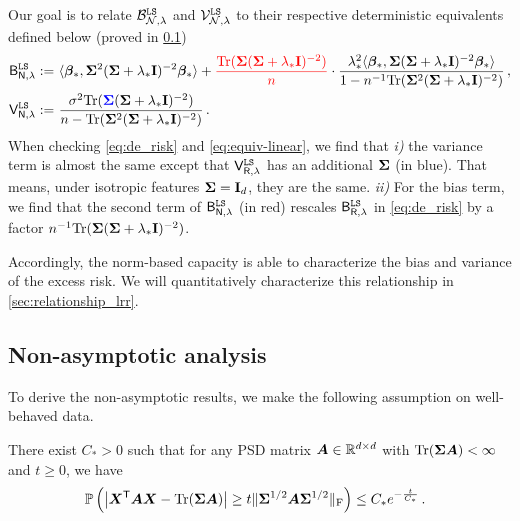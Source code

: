 Our goal is to relate $\mathcal{B}^{\tt LS}_{\mathcal{N},\lambda}$ and $\mathcal{V}^{\tt LS}_{\mathcal{N},\lambda}$ to their respective deterministic equivalents defined below (proved in \cref{sec:linear_nonasym})
\begin{align}
    \mathsf B_{\mathsf N,\lambda}^{\tt LS} :=&~ \langle{\boldsymbol \beta}_*, {\boldsymbol \Sigma}^2({\boldsymbol \Sigma} + \lambda_*{\mathbf I})^{-2}{\boldsymbol \beta}_*\rangle +{\color{red}\frac{{\rm Tr}({\boldsymbol \Sigma}({\boldsymbol \Sigma} + \lambda_*{\mathbf I})^{-2})}{n}} \cdot \frac{\lambda_*^2 \langle {\boldsymbol \beta}_*,{\boldsymbol \Sigma}({\boldsymbol \Sigma} + \lambda_*{\mathbf I})^{-2}{\boldsymbol \beta}_*\rangle}{1-n^{-1}{\rm Tr}({\boldsymbol \Sigma}^2({\boldsymbol \Sigma} + \lambda_*{\mathbf I})^{-2})} \,, \notag \\
    \mathsf V_{\mathsf N,\lambda}^{\tt LS} :=&~ \frac{\sigma^2{\rm Tr}({\color{blue}{\boldsymbol \Sigma}}({\boldsymbol \Sigma}+\lambda_*{\mathbf I})^{-2})}{n-{\rm Tr}({\boldsymbol \Sigma}^2({\boldsymbol \Sigma}+\lambda_*{\mathbf I})^{-2})}\,. \label{eq:equiv-linear}
\end{align}
When checking \cref{eq:de_risk} and \cref{eq:equiv-linear}, we find that \textit{i)} the variance term is almost the same except that $\mathsf V^{\tt LS}_{\mathsf R,\lambda}$ has an additional ${\boldsymbol \Sigma}$ ({\color{blue}in blue}). That means, under isotropic features $\bm \Sigma = {\mathbf I}_d$, they are the same.
\textit{ii)} For the bias term, we find that the second term of $\mathsf B_{\mathsf N,\lambda}^{\tt LS}$ ({\color{red}in red}) rescales $\mathsf B_{\mathsf R,\lambda}^{\tt LS}$ in \cref{eq:de_risk} by a factor $n^{-1}{\rm Tr}({\boldsymbol \Sigma}({\boldsymbol \Sigma} + \lambda_*{\mathbf I})^{-2})$.

Accordingly, the norm-based capacity is able to characterize the bias and variance of the excess risk.
We will quantitatively characterize this relationship in \cref{sec:relationship_lrr}.


\subsection{Non-asymptotic analysis}
\label{sec:linear_nonasym}

To derive the non-asymptotic results, we make the following assumption on well-behaved data.
\begin{assumption}\label{ass:concentrated_LR} There exist $C_* > 0$ such that for any PSD matrix ${\boldsymbol A} \in \mathbb{R}^{d \times d}$ with ${\rm Tr}(\bm{\Sigma A}) < \infty$ and $t\ge 0$, we have
    \[
    \begin{aligned}
         &~\mathbb{P}\left(\left| {\boldsymbol X}^{\mathsf T} {\boldsymbol A} {\boldsymbol X} - {\rm Tr}(\bm{\Sigma A}) \right| \geq t\|{\boldsymbol \Sigma}^{1/2} {\boldsymbol A} {\boldsymbol \Sigma}^{1/2}\|_{\mathrm{F}} \right) \leq C_* e^{-\frac{t}{C_*}}\,.
    \end{aligned}
    \]
\end{assumption}


